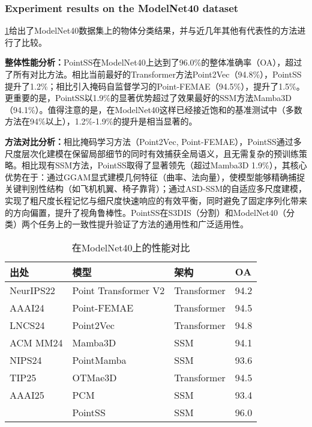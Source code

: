 \documentclass[preprint,12pt]{elsarticle}
\begin{document}
\subsubsection{Experiment results on the ModelNet40 dataset}

\cref{tab:ModelNet}给出了ModelNet40数据集上的物体分类结果，并与近几年其他有代表性的方法进行了比较。

\textbf{整体性能分析：}PointSS在ModelNet40上达到了96.0\%的整体准确率（OA），超过了所有对比方法。相比当前最好的Transformer方法Point2Vec（94.8\%），PointSS提升了1.2\%；相比引入掩码自监督学习的Point-FEMAE（94.5\%），提升了1.5\%。更重要的是，PointSS以1.9\%的显著优势超过了效果最好的SSM方法Mamba3D（94.1\%）。值得注意的是，在ModelNet40这样已经接近饱和的基准测试中（多数方法在94\%以上），1.2\%-1.9\%的提升是相当显著的。

\textbf{方法对比分析：}相比掩码学习方法（Point2Vec, Point-FEMAE），PointSS通过多尺度层次化建模在保留局部细节的同时有效捕获全局语义，且无需复杂的预训练策略。相比现有SSM方法，PointSS取得了显著领先（超过Mamba3D 1.9\%），其核心优势在于：通过GGAM显式建模几何特征（曲率、法向量），使模型能够精确捕捉关键判别性结构（如飞机机翼、椅子靠背）；通过ASD-SSM的自适应多尺度建模，实现了粗尺度长程记忆与细尺度快速响应的有效平衡，同时避免了固定序列化带来的方向偏置，提升了视角鲁棒性。PointSS在S3DIS（分割）和ModelNet40（分类）两个任务上的一致性提升验证了方法的通用性和广泛适用性。

\begin{table}[htbp!]
	\centering
	\caption{在ModelNet40上的性能对比}
	\label{tab:ModelNet}
	\begin{tabular}{@{}llll@{}}
		\toprule
		\textbf{出处}  & \textbf{模型}           & \textbf{架构} & \textbf{OA} \\ \midrule
		NeurIPS22 & Point Transformer V2\cite{ptv2}  & Transformer & 94.2          \\
		AAAI24    & Point-FEMAE\cite{FEMAE}        & Transformer & 94.5             \\
		LNCS24      & Point2Vec\cite{Point2Vec}      & Transformer & 94.8          \\
		ACM MM24     & Mamba3D\cite{Mamba3D}              & SSM & 94.1          \\
		NIPS24    & PointMamba\cite{PointMamba}   & SSM         & 93.6         \\
		TIP25     & OTMae3D\cite{OTMae3D}    & Transformer & 94.5          \\
		AAAI25    & PCM\cite{pcm}     & SSM         & 93.4         \\
		& PointSS               &SSM             & 96.0          \\ \bottomrule
	\end{tabular}
\end{table}
\end{document}
